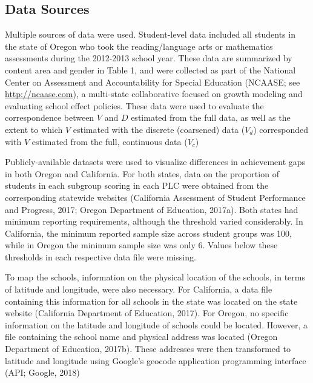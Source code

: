 \documentclass[man, fleqn, noextraspace]{apa6}
\theoremstyle{definition}
\theoremstyle{definition}
\theoremstyle{definition}
\theoremstyle{remark}
\begin{document}
\hypertarget{data-sources}{%
\subsection{Data Sources}\label{data-sources}}

Multiple sources of data were used. Student-level data included all
students in the state of Oregon who took the reading/language arts or
mathematics assessments during the 2012-2013 school year. These data are
summarized by content area and gender in Table 1, and were collected as
part of the National Center on Assessment and Accountability for Special
Education (NCAASE; see \url{http://ncaase.com}), a multi-state
collaborative focused on growth modeling and evaluating school effect
policies. These data were used to evaluate the correspondence between
\(V\) and \(D\) estimated from the full data, as well as the extent to
which \(V\) estimated with the discrete (coarsened) data (\(V_{d}\))
corresponded with \(V\) estimated from the full, continuous data
(\(V_{c}\))

Publicly-available datasets were used to visualize differences in
achievement gaps in both Oregon and California. For both states, data on
the proportion of students in each subgroup scoring in each PLC were
obtained from the corresponding statewide websites (California
Assessment of Student Performance and Progress, 2017; Oregon Department
of Education, 2017a). Both states had minimum reporting requirements,
although the threshold varied considerably. In California, the minimum
reported sample size across student groups was 100, while in Oregon the
minimum sample size was only 6. Values below these thresholds in each
respective data file were missing.

To map the schools, information on the physical location of the schools,
in terms of latitude and longitude, were also necessary. For California,
a data file containing this information for all schools in the state was
located on the state website (California Department of Education, 2017).
For Oregon, no specific information on the latitude and longitude of
schools could be located. However, a file containing the school name and
physical address was located (Oregon Department of Education, 2017b).
These addresses were then transformed to latitude and longitude using
Google's geocode application programming interface (API; Google, 2018)
\end{document}
